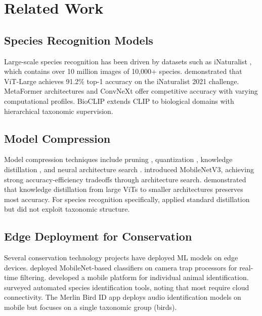 \section{Related Work}

\label{sec:related}

\subsection{Species Recognition Models}

Large-scale species recognition has been driven by datasets such as iNaturalist \citep{vanhorn2018inaturalist}, which contains over 10 million images of 10,000+ species.
\citet{vanhorn2021benchmarking} demonstrated that ViT-Large achieves 91.2\% top-1 accuracy on the iNaturalist 2021 challenge.
MetaFormer architectures \citep{yu2022metaformer} and ConvNeXt \citep{liu2022convnet} offer competitive accuracy with varying computational profiles.
BioCLIP \citep{stevens2024bioclip} extends CLIP to biological domains with hierarchical taxonomic supervision.

\subsection{Model Compression}

Model compression techniques include pruning \citep{han2015learning}, quantization \citep{jacob2018quantization}, knowledge distillation \citep{hinton2015distilling}, and neural architecture search \citep{tan2019efficientnet}.
\citet{howard2019searching} introduced MobileNetV3, achieving strong accuracy-efficiency tradeoffs through architecture search.
\citet{touvron2021training} demonstrated that knowledge distillation from large ViTs to smaller architectures preserves most accuracy.
For species recognition specifically, \citet{picek2022overcoming} applied standard distillation but did not exploit taxonomic structure.

\subsection{Edge Deployment for Conservation}

Several conservation technology projects have deployed ML models on edge devices.
\citet{ahumada2020wildlife} deployed MobileNet-based classifiers on camera trap processors for real-time filtering.
\citet{bergerwolf2017wildbook} developed a mobile platform for individual animal identification.
\citet{terry2020automated} surveyed automated species identification tools, noting that most require cloud connectivity.
The Merlin Bird ID app \citep{wood2011ebird} deploys audio identification models on mobile but focuses on a single taxonomic group (birds).

